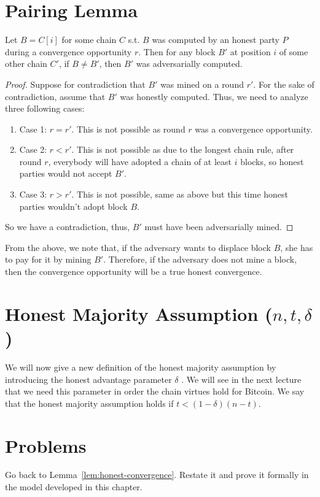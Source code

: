 \section{Pairing Lemma}
\begin{lemma}
Let $B = C[i]$ for some chain $C$ s.t. $B$ was computed by an honest party $P$ during a convergence opportunity $r$. Then for any block $B'$ at position $i$ of some other chain $C'$, if $B \neq B'$, then $B'$ was adversarially computed.
\end{lemma}
\begin{proof}
Suppose for contradiction that $B'$ was mined on a round $r'$. For the sake of contradiction, assume that $B'$ was honestly computed. Thus, we need to analyze three following cases:
\begin{enumerate}
    \item Case 1: $r = r'$. This is not possible as round $r$ was a convergence opportunity.
    \item Case 2: $r < r'$. This is not possible as due to the longest chain rule, after round $r$, everybody will have adopted a chain of at least $i$ blocks, so honest parties would not accept $B'$.
    \item Case 3: $r > r'$. This is not possible, same as above but this time honest parties wouldn't adopt block $B$.
\end{enumerate}
So we have a contradiction, thus, $B'$ must have been adversarially mined.
\end{proof}

From the above, we note that,
if the adversary wants to displace block $B$, she has to pay for it by mining $B'$. Therefore, if the adversary does not mine a block, then the convergence opportunity will be a true honest convergence.

\section{Honest Majority Assumption (\texorpdfstring{$n, t, \delta$}{Lg})}
We will now give a new definition of the honest majority assumption by introducing the honest advantage parameter $\delta$ . We will see in the next lecture that we need this parameter in order the chain virtues hold for Bitcoin. We say that the honest majority assumption holds if $t < (1 - \delta)(n - t)$.

\section*{Problems}
\begin{problems}
    \item Go back to Lemma~\ref{lem:honest-convergence}. Restate it and prove it formally in the model developed in this chapter.
\end{problems}

